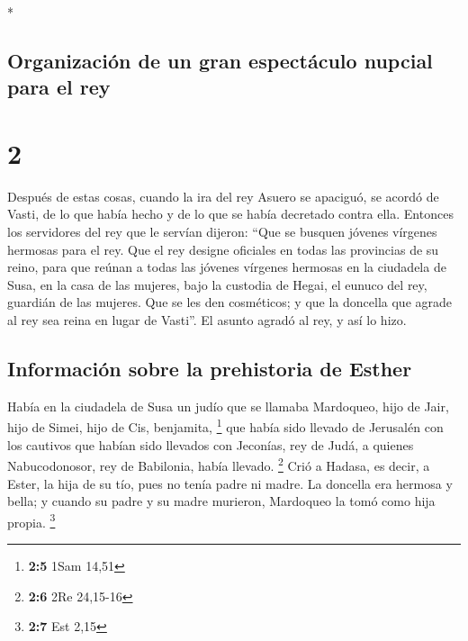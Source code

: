 \begin{paracol}{2}
\begin{otherlanguage}{english}
\end{otherlanguage}

\switchcolumn[0]*

\hypertarget{organizaciuxf3n-de-un-gran-espectuxe1culo-nupcial-para-el-rey}{%
\subsection{Organización de un gran espectáculo nupcial para el
rey}\label{organizaciuxf3n-de-un-gran-espectuxe1culo-nupcial-para-el-rey}}

\hypertarget{section-2}{%
\section{2}\label{section-2}}

 Después de estas cosas, cuando la ira del rey Asuero se
apaciguó, se acordó de Vasti, de lo que había hecho y de lo que se había
decretado contra ella.  Entonces los servidores del rey
que le servían dijeron: ``Que se busquen jóvenes vírgenes hermosas para
el rey.  Que el rey designe oficiales en todas las
provincias de su reino, para que reúnan a todas las jóvenes vírgenes
hermosas en la ciudadela de Susa, en la casa de las mujeres, bajo la
custodia de Hegai, el eunuco del rey, guardián de las mujeres. Que se
les den cosméticos;  y que la doncella que agrade al rey
sea reina en lugar de Vasti''. El asunto agradó al rey, y así lo hizo.

\hypertarget{informaciuxf3n-sobre-la-prehistoria-de-esther}{%
\subsection{Información sobre la prehistoria de
Esther}\label{informaciuxf3n-sobre-la-prehistoria-de-esther}}

 Había en la ciudadela de Susa un judío que se llamaba
Mardoqueo, hijo de Jair, hijo de Simei, hijo de Cis, benjamita,
\footnote{\textbf{2:5} 1Sam 14,51}  que había sido llevado
de Jerusalén con los cautivos que habían sido llevados con Jeconías, rey
de Judá, a quienes Nabucodonosor, rey de Babilonia, había llevado.
\footnote{\textbf{2:6} 2Re 24,15-16}  Crió a Hadasa, es
decir, a Ester, la hija de su tío, pues no tenía padre ni madre. La
doncella era hermosa y bella; y cuando su padre y su madre murieron,
Mardoqueo la tomó como hija propia. \footnote{\textbf{2:7} Est 2,15}


\end{paracol}
